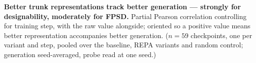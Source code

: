 \begin{table}[tbp]
\centering
\small

\caption{\textbf{Better trunk representations track better generation --- strongly for designability, moderately for FPSD.} Partial Pearson correlation controlling for training step, with the raw value alongside; oriented so a positive value means better representation accompanies better generation. ($n{=}59$ checkpoints, one per variant and step, pooled over the baseline, REPA variants and random control; generation seed-averaged, probe read at one seed.)}
\label{tab:proteina-genrep-corr}
\end{table}
